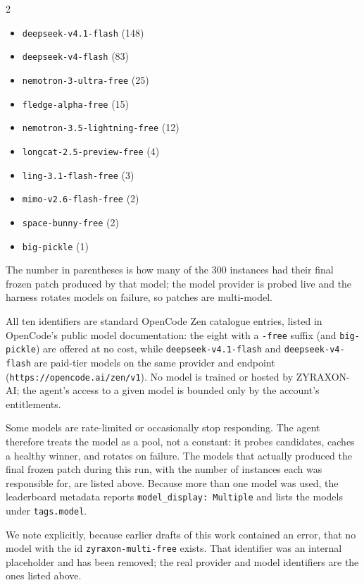 \documentclass[11pt,a4paper]{article}
\begin{document}
\begin{multicols}{2}
\begin{itemize}[leftmargin=1.2em]
  \item \texttt{deepseek-v4.1-flash} (148)
  \item \texttt{deepseek-v4-flash} (83)
  \item \texttt{nemotron-3-ultra-free} (25)
  \item \texttt{fledge-alpha-free} (15)
  \item \texttt{nemotron-3.5-lightning-free} (12)
  \item \texttt{longcat-2.5-preview-free} (4)
  \item \texttt{ling-3.1-flash-free} (3)
  \item \texttt{mimo-v2.6-flash-free} (2)
  \item \texttt{space-bunny-free} (2)
  \item \texttt{big-pickle} (1)
\end{itemize}
\end{multicols}

\noindent The number in parentheses is how many of the 300 instances had their
final frozen patch produced by that model; the model provider is probed live and
the harness rotates models on failure, so patches are multi-model.

\noindent All ten identifiers are standard OpenCode Zen catalogue entries, listed in
OpenCode's public model documentation: the eight with a \texttt{-free} suffix (and
\texttt{big-pickle}) are offered at no cost, while \texttt{deepseek-v4.1-flash} and
\texttt{deepseek-v4-flash} are paid-tier models on the same provider and endpoint
(\texttt{https://opencode.ai/zen/v1}). No model is trained or hosted by ZYRAXON-AI;
the agent's access to a given model is bounded only by the account's entitlements.

Some models are rate-limited or occasionally stop responding. The agent therefore
treats the model as a pool, not a constant: it probes candidates, caches a healthy
winner, and rotates on failure. The models that actually produced the final frozen patch during this run, with the
number of instances each was responsible for, are listed above. Because more than one model was used, the leaderboard
metadata reports \texttt{model\_display: Multiple} and lists the models under
\texttt{tags.model}.

We note explicitly, because earlier drafts of this work contained an error, that no
model with the id \texttt{zyraxon-multi-free} exists. That identifier was an internal
placeholder and has been removed; the real provider and model identifiers are the ones
listed above.
\end{document}

